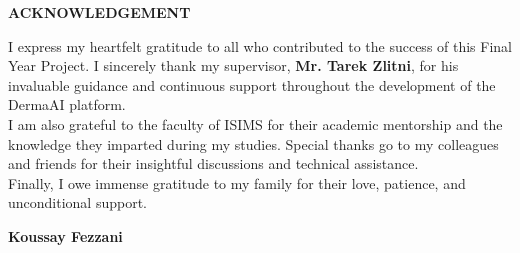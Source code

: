 \clearpage
\vspace*{0.15\textheight}
\begin{center}
    {\Huge \bfseries ACKNOWLEDGEMENT} \\[3em]
\end{center}

\begin{flushleft}
    I express my heartfelt gratitude to all who contributed to the success of this Final Year Project. I sincerely thank my supervisor, \textbf{Mr. Tarek Zlitni}, for his invaluable guidance and continuous support throughout the development of the DermaAI platform.\\[1.5em]

    I am also grateful to the faculty of ISIMS for their academic mentorship and the knowledge they imparted during my studies. Special thanks go to my colleagues and friends for their insightful discussions and technical assistance.\\[1.5em]

    Finally, I owe immense gratitude to my family for their love, patience, and unconditional support.\\[3em]
\end{flushleft}

\begin{flushright}
    \textbf{Koussay Fezzani}
\end{flushright}
\newpage
